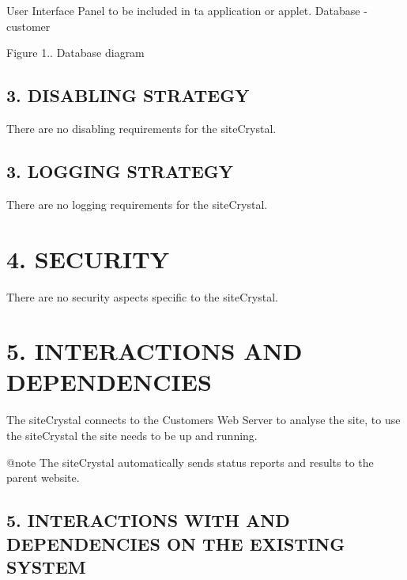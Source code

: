 \begin{DoxyCode}
User Interface Panel to be included in ta application or applet.
Database - customer
\end{DoxyCode}


 Figure 1.. Database diagram\hypertarget{index_sec_3_2}{}\subsection{3.	\+D\+I\+S\+A\+B\+L\+I\+N\+G S\+T\+R\+A\+T\+E\+G\+Y}\label{index_sec_3_2}
\begin{DoxyVerb}There are no disabling requirements for the siteCrystal.
\end{DoxyVerb}
\hypertarget{index_sec_3_3}{}\subsection{3.	\+L\+O\+G\+G\+I\+N\+G S\+T\+R\+A\+T\+E\+G\+Y}\label{index_sec_3_3}
\begin{DoxyVerb}There are no logging requirements for the siteCrystal.
\end{DoxyVerb}
\hypertarget{index_sec_4}{}\section{4.	\+S\+E\+C\+U\+R\+I\+T\+Y}\label{index_sec_4}
\begin{DoxyVerb}There are no security aspects specific to the siteCrystal.
\end{DoxyVerb}
\hypertarget{index_sec_5}{}\section{5.	\+I\+N\+T\+E\+R\+A\+C\+T\+I\+O\+N\+S A\+N\+D D\+E\+P\+E\+N\+D\+E\+N\+C\+I\+E\+S}\label{index_sec_5}
\begin{DoxyVerb}The siteCrystal connects to the Customers Web Server to analyse the site,
to use the siteCrystal the site needs to be up and running.

@note The siteCrystal automatically sends status reports and results to the parent website.
\end{DoxyVerb}
\hypertarget{index_sec_5_1}{}\subsection{5.	\+I\+N\+T\+E\+R\+A\+C\+T\+I\+O\+N\+S W\+I\+T\+H A\+N\+D D\+E\+P\+E\+N\+D\+E\+N\+C\+I\+E\+S O\+N T\+H\+E E\+X\+I\+S\+T\+I\+N\+G S\+Y\+S\+T\+E\+M}\label{index_sec_5_1}
